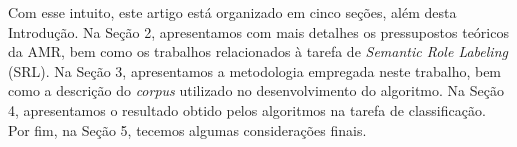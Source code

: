 Com esse intuito, este artigo está organizado em cinco seções, além
desta Introdução. Na Seção 2, apresentamos com mais detalhes os
pressupostos teóricos da AMR, bem como os trabalhos relacionados à
tarefa de \emph{Semantic Role Labeling} (SRL). Na Seção 3, apresentamos
a metodologia empregada neste trabalho, bem como a descrição do
\emph{corpus} utilizado no desenvolvimento do algoritmo. Na Seção 4,
apresentamos o resultado obtido pelos algoritmos na tarefa de
classificação. Por fim, na Seção 5, tecemos algumas considerações
finais.